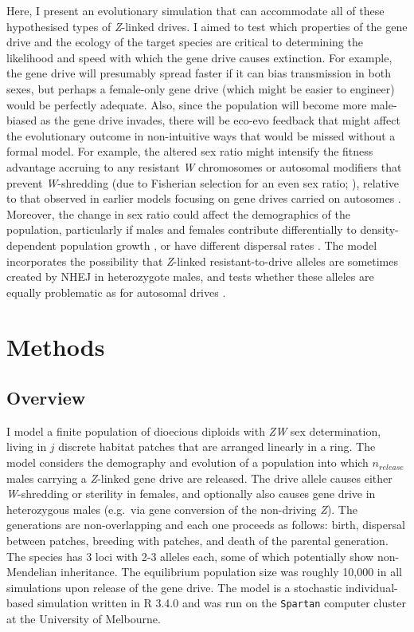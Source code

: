 \documentclass[]{rsos}%
\begin{document}
Here, I present an evolutionary simulation that can accommodate all of
these hypothesised types of \emph{Z}-linked drives. I aimed to test
which properties of the gene drive and the ecology of the target species
are critical to determining the likelihood and speed with which the gene
drive causes extinction. For example, the gene drive will presumably
spread faster if it can bias transmission in both sexes, but perhaps a
female-only gene drive (which might be easier to engineer) would be
perfectly adequate. Also, since the population will become more
male-biased as the gene drive invades, there will be eco-evo feedback
that might affect the evolutionary outcome in non-intuitive ways that
would be missed without a formal model. For example, the altered sex
ratio might intensify the fitness advantage accruing to any resistant
\emph{W} chromosomes or autosomal modifiers that prevent
\emph{W}-shredding (due to Fisherian selection for an even sex ratio;
\citep{holman2015co}), relative to that observed in earlier models
focusing on gene drives carried on autosomes
\citep{unckless2017ev, drury2017cr}. Moreover, the change in sex ratio
could affect the demographics of the population, particularly if males
and females contribute differentially to density-dependent population
growth \citep{rankin2007ma, li2019int}, or have different dispersal
rates \citep{li2019sex}. The model incorporates the possibility that
\emph{Z}-linked resistant-to-drive alleles are sometimes created by NHEJ
in heterozygote males, and tests whether these alleles are equally
problematic as for autosomal drives
\citep{gantz2015mu, gantz2015hi, hammond2016cr, wang2016cr, unckless2017ev}.

\hypertarget{methods}{%
\section{Methods}\label{methods}}

\hypertarget{overview}{%
\subsection{Overview}\label{overview}}

I model a finite population of dioecious diploids with \emph{ZW} sex
determination, living in \(j\) discrete habitat patches that are
arranged linearly in a ring. The model considers the demography and
evolution of a population into which \(n_{release}\) males carrying a
\emph{Z}-linked gene drive are released. The drive allele causes either
\emph{W}-shredding or sterility in females, and optionally also causes
gene drive in heterozygous males (e.g.~via gene conversion of the
non-driving \emph{Z}). The generations are non-overlapping and each one
proceeds as follows: birth, dispersal between patches, breeding with
patches, and death of the parental generation. The species has 3 loci
with 2-3 alleles each, some of which potentially show non-Mendelian
inheritance. The equilibrium population size was roughly 10,000 in all
simulations upon release of the gene drive. The model is a stochastic
individual-based simulation written in R 3.4.0 and was run on the
\texttt{Spartan} computer cluster at the University of Melbourne.
\end{document}
